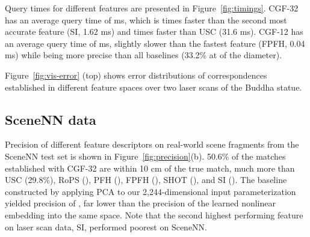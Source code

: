 \begin{comment}
\begin{figure}[ht]
\vspace{-1em}
\centering
\texttt{[image: laser.pdf]}
\caption{The precision of several geometric feature descriptors on laser scan data in the test set. For correspondences provided by our feature space, 41.4\% are precise to within  of the diameter. Prior feature descriptors are less accurate.}
\label{fig:laserscan}
\end{figure}
\end{comment}

Query times for different features are presented in Figure~\ref{fig:timings}. CGF-32 has an average query time of  ms, which is  times faster than the second most accurate feature (SI, 1.62 ms) and  times faster than USC (31.6 ms). CGF-12 has an average query time of  ms, slightly slower than the fastest feature (FPFH, 0.04 ms) while being more precise than all baselines (33.2\% at  of the diameter).

\begin{comment}
\begin{figure}[h]
\centering
    \texttt{[image: laser-timings-1.pdf]}
\caption{Query time and precision on laser scans.}
\label{fig:timing-lasers}
\end{figure}
\end{comment}
Figure~\ref{fig:vis-error} (top) shows error distributions of correspondences established in different feature spaces over two laser scans of the Buddha statue.


\subsection{SceneNN data}
\label{sec:scenenncorr}

Precision of different feature descriptors on real-world scene fragments from the SceneNN test set is shown in Figure~\ref{fig:precision}(b). 50.6\% of the matches established with CGF-32 are within 10 cm of the true match, much more than USC (29.8\%), RoPS (), PFH (), FPFH (), SHOT (), and SI ().
The baseline constructed by applying PCA to our 2,244-dimensional input parameterization yielded precision of , far lower than the precision of the learned nonlinear embedding into the same space. Note that the second highest performing feature on laser scan data, SI, performed poorest on SceneNN.

\begin{comment}
\begin{figure}[!ht]
\centering
\texttt{[image: \{scenenn]}.pdf}
\caption{Precision of local geometric features on pairs of fragments from the SceneNN test set. CGF-32 yields the highest precision: 50.6\% of the matches computed in the learned feature space are within 10 cm of the ground truth. USC (a \mbox{1,980-dimensional} descriptor) comes in second at 29.8\%.}
\label{fig:scenenn}
\end{figure}
\end{comment}

